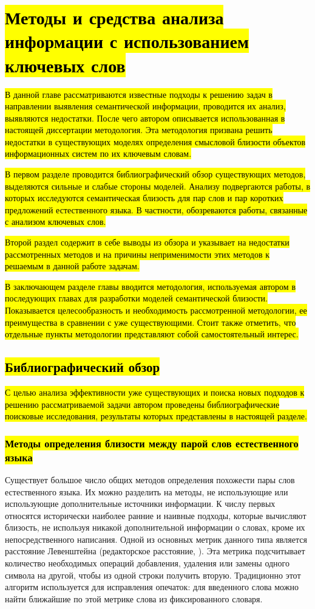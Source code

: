 \chapter{\hl{Методы и средства анализа информации с использованием ключевых слов}} \label{chapt_related_work}
\hl{В данной главе рассматриваются известные подходы к решению задач в направлении выявления семантической информации, проводится их анализ, выявляются недостатки. После чего автором описывается использованная в настоящей диссертации методология. Эта методология призвана решить недостатки в существующих моделях определения смысловой близости объектов информационных систем по их ключевым словам.}

\hl{В первом разделе проводится библиографический обзор существующих методов, выделяются сильные и слабые стороны моделей. Анализу подвергаются работы, в которых исследуются семантическая близость для пар слов и пар коротких предложений естественного языка. В частности, обозреваются работы, связанные с анализом ключевых слов.}

\hl{Второй раздел содержит в себе выводы из обзора и указывает на недостатки рассмотренных методов и на причины неприменимости этих методов к решаемым в данной работе задачам.}

\hl{В заключающем разделе главы вводится методология, используемая автором в последующих главах для разработки моделей семантической близости. Показывается целесообразность и необходимость рассмотренной методологии, ее преимущества в сравнении с уже существующими. Стоит также отметить, что отдельные пункты методологии представляют собой самостоятельный интерес.}

\section{\hl{Библиографический обзор}}

\hl{С целью анализа эффективности уже существующих и поиска новых подходов к решению рассматриваемой задачи автором проведены библиографические поисковые исследования, результаты которых представлены в настоящей разделе.}

\subsection{\hl{Методы определения близости между парой слов естественного языка}}


Существует большое число общих методов определения похожести пары слов естественного языка. Их можно разделить на методы, не использующие или использующие дополнительные источники информации. К числу первых относятся исторически наиболее ранние и наивные подходы, которые вычисляют близость, не используя никакой дополнительной информации о словах, кроме их непосредственного написания. Одной из основных метрик данного типа является расстояние Левенштейна  (редакторское расстояние, \cite{leven}). Эта метрика подсчитывает количество необходимых операций добавления, удаления или замены одного символа на другой, чтобы из одной строки получить вторую. Традиционно этот алгоритм используется для исправления опечаток: для введенного слова можно найти ближайшие по этой метрике слова из фиксированного словаря. 

